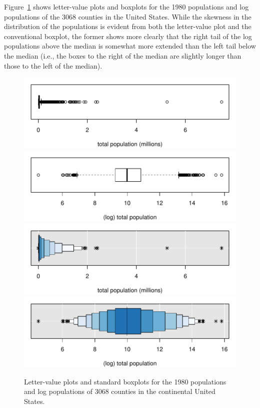 \documentclass[12pt,oneside]{article}
\begin{document}
Figure~\ref{lvpops} shows letter-value plots and boxplots for the 1980 populations and log populations of the 3068 counties in the United States. While the skewness in the distribution of the populations is evident from both the letter-value plot and the conventional boxplot, the former shows more clearly that the right tail of the log populations above the median is somewhat more extended than the left tail below the median (i.e., the boxes to the right of the median are slightly longer than those to the left of the median).

\begin{figure}[hbtp]
  \centering
  \includegraphics[scale=.5]{counties-lvpop-a.pdf}
  \includegraphics[scale=.5]{counties-lvpop-c.pdf}
  \includegraphics[scale=.5]{counties-lvpop-b.pdf}
  \includegraphics[scale=.5]{counties-lvpop-d.pdf}
 
  \caption{Letter-value plots and standard boxplots for the 1980
  populations and log populations of 3068 counties in the continental United
  States.}
  \label{lvpops} 
\end{figure}
\end{document}
